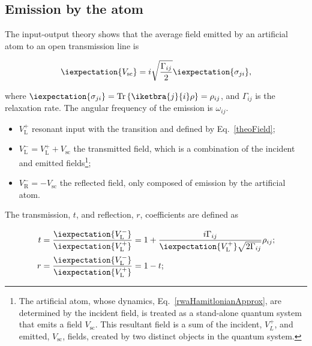 \subsection{Emission by the atom\label{subsec:Scattering}}
\begin{framed}\noindent
  The input-output  theory shows  that the average  field emitted  by an
  artificial atom to an open transmission line is

\begin{equation}\label{theoEmission}
  \iexpectation{V_{\text{sc}}} =  i\sqrt{\frac{\Gamma_{ij}}{2}}\iexpectation{\sigma_{ji}},
\end{equation}
\end{framed}

\noindent                                                          where
$   \iexpectation{\sigma_{ji}}=\text{Tr}\left\lbrace  \iketbra{j}{i}\rho
\right\rbrace   =   \rho_{ij}   $,   and  $   \Gamma_{ij}   $   is   the
\ilra{}  relaxation rate.   The angular  frequency of  the
emission is $ \omega_{ij} $.
\begin{itemize}
\item $ V_{\text{L}}^{+} $ resonant input with the \ilra{}
  transition and defined by Eq.~\eqref{theoField};
\item   $   V_{\text{L}}^{-}   =   V_{\text{L}}^{+}+V_{\text{sc}}$   the
  transmitted field, which is a  combination of the incident and emitted
  fields\footnote{The      artificial     atom,      whose     dynamics,
    Eq.~\eqref{rwaHamitlonianApprox},  are  determined by  the  incident
    field, is treated as a stand-alone quantum system that emits a field
    $ V_{\text{sc}} $.   This resultant field is a sum  of the incident,
    $V_{L}^{+} $, and emitted, $ V_{\text{sc}} $, fields, created by two
    distinct objects in the quantum system.};
\item $  V_{\text{R}}^{-} = -  V_{\text{sc}}$ the reflected  field, only
  composed of emission by the artificial atom.
\end{itemize}

The transmission, $ t $, and reflection, $ r $, coefficients are defined
as

\begin{equation}\label{theoRefTran}
  \begin{aligned}
    t & = \frac{\iexpectation{V_{\text{L}}^{-}}}{\iexpectation{V_{\text{L}}^{+}}} = 1+\frac{i\Gamma_{ij}}{\iexpectation{V_{\text{L}}^{+}}\sqrt{2\Gamma_{ij}}}\rho_{ij};\\
    r                                 &                                =
    \frac{\iexpectation{V_{\text{L}}^{-}}}{\iexpectation{V_{\text{L}}^{+}}}
    = 1-t;
  \end{aligned}
\end{equation}

